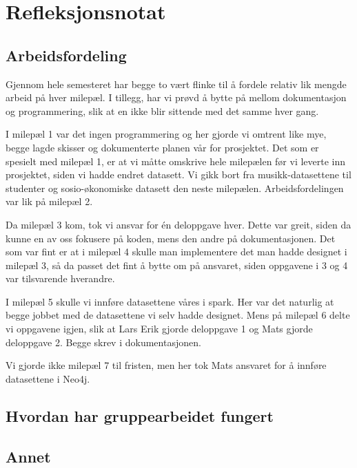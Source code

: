 \section{Refleksjonsnotat}
\subsection{Arbeidsfordeling}
Gjennom hele semesteret har begge to vært flinke til å fordele relativ lik mengde arbeid på hver milepæl. I tillegg, har vi prøvd å bytte på mellom dokumentasjon og programmering, slik at en ikke blir sittende med det samme hver gang.

I milepæl 1 var det ingen programmering og her gjorde vi omtrent like mye, begge lagde skisser og dokumenterte planen vår for prosjektet. Det som er spesielt med milepæl 1, er at vi måtte omskrive hele milepælen før vi leverte inn prosjektet, siden vi hadde endret datasett. Vi gikk bort fra musikk-datasettene til studenter og sosio-økonomiske datasett den neste milepælen. Arbeidsfordelingen var lik på milepæl 2.

Da milepæl 3 kom, tok vi ansvar for én deloppgave hver. Dette var greit, siden da kunne en av oss fokusere på koden, mens den andre på dokumentasjonen. Det som var fint er at i milepæl 4 skulle man implementere det man hadde designet i milepæl 3, så da passet det fint å bytte om på ansvaret, siden oppgavene i 3 og 4 var tilsvarende hverandre.

I milepæl 5 skulle vi innføre datasettene våres i spark. Her var det naturlig at begge jobbet med de datasettene vi selv hadde designet. Mens på milepæl 6 delte vi oppgavene igjen, slik at Lars Erik gjorde deloppgave 1 og Mats gjorde deloppgave 2. Begge skrev i dokumentasjonen.

Vi gjorde ikke milepæl 7 til fristen, men her tok Mats ansvaret for å innføre datasettene i Neo4j.

\subsection{Hvordan har gruppearbeidet fungert}
\subsection{Annet}